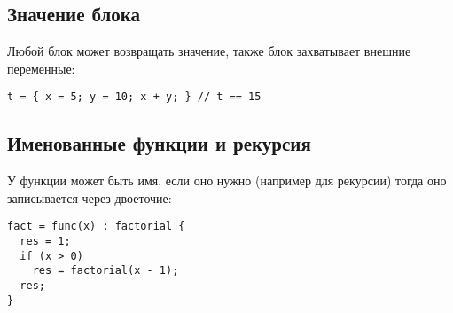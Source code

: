 \documentclass[a4paper,12pt]{article}
\begin{document}
\subsection{Значение блока}

Любой блок может возвращать значение, также блок захватывает внешние переменные:

\begin{tcolorbox}[colback=bg, colframe=frame, title=Блок как выражение]
\begin{verbatim}
t = { x = 5; y = 10; x + y; } // t == 15
\end{verbatim}
\end{tcolorbox}

\subsection{Именованные функции и рекурсия}

У функции может быть имя, если оно нужно (например для рекурсии) тогда оно записывается через двоеточие:

\begin{tcolorbox}[colback=bg, colframe=frame, title=Пример рекурсивной функции]
\begin{verbatim}
fact = func(x) : factorial {
  res = 1;
  if (x > 0)
    res = factorial(x - 1);
  res;
}
\end{verbatim}
\end{tcolorbox}
\end{document}
